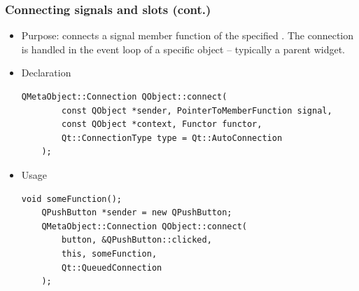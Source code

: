 \begin{frame}[fragile]
  \frametitle{Connecting signals and slots (cont.)}
   \begin{itemize}
      \item Purpose: connects a signal member function of \verb@sender@ the
        specified \verb@functor@. The connection is handled in the event loop
        of a specific \verb@context@ object -- typically a parent widget.
      \item Declaration
      \begin{lstlisting}[basicstyle=\scriptsize\ttfamily]
	QMetaObject::Connection QObject::connect(
	    const QObject *sender, PointerToMemberFunction signal,
	    const QObject *context, Functor functor,
	    Qt::ConnectionType type = Qt::AutoConnection
	);
      \end{lstlisting}
      \item Usage
      \begin{lstlisting}[basicstyle=\scriptsize\ttfamily]
	void someFunction();
	QPushButton *sender = new QPushButton;
	QMetaObject::Connection QObject::connect(
	    button, &QPushButton::clicked,
	    this, someFunction,
	    Qt::QueuedConnection
	);
      \end{lstlisting}
    \end{itemize}
\end{frame}


